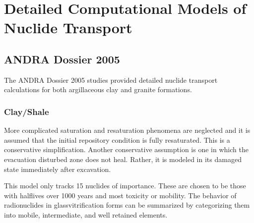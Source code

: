 \section{Detailed Computational Models of Nuclide Transport}
\label{sec:detailed_nuclide}

\subsection{ANDRA Dossier 2005} The ANDRA Dossier 2005 studies provided
detailed nuclide transport calculations for both argillaceous clay and granite
formations.

\subsubsection{Clay/Shale} More complicated saturation and resaturation phenomena 
are neglected and it is assumed that the initial repository condition is fully
resaturated. This is a conservative simplification. Another conservative
assumption is one in which the evacuation disturbed zone does not heal. Rather,
it is modeled in its damaged state immediately after excavation. 

This model only tracks 15 nuclides of importance.  These are chosen to be those
with halflives over 1000 years and most toxicity or mobility.
\cite{andra_argile:_2005} The behavior of radionuclides in 
glassvitrification forms can be summarized by categorizing them into mobile,
intermediate, and well retained elements. 








